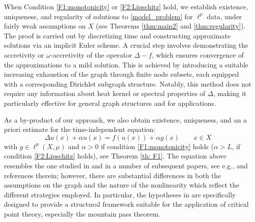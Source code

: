 \documentclass[journal]{article}
\theoremstyle{nonitalic}
\theoremstyle{nonitalic}
\theoremstyle{plain} %
\numberwithin{equation}{section}
\begin{document}
When Condition \ref{F1:monotonicity} or \ref{F2:Lipschitz} hold, we establish existence, uniqueness, and regularity of solutions to \ref{model_problem} for $\ell^p$ data, under fairly weak assumptions on $X$ (see Theorems \ref{thm:main2} and \ref{thm:regularity}). The proof is carried out by discretizing time and constructing approximate solutions via an implicit Euler scheme. A crucial step involves demonstrating the accretivity or $\omega$-accretivity of the operator $\Delta-f$, which ensures convergence of the approximations to a mild solution. This is achieved by introducing a suitable increasing exhaustion of the graph through finite node subsets, each equipped with a corresponding Dirichlet subgraph structure. Notably, this method does not require any information about heat kernel or spectral properties of $\Delta$, making it particularly effective for general graph structures and for applications. 

As a by-product of our approach, we also obtain existence, uniqueness, and an a priori estimate for the time-independent equation:
\begin{equation*}
  \Delta u (x)+ \alpha u(x)=f(u(x))+ \alpha g(x)\quad  \quad x \in X
\end{equation*}
with $g \in \ell^p(X,\mu)$ and $\alpha>0$ if condition \textnormal{\ref{F1:monotonicity}} holds ($\alpha>L$, if condition \textnormal{\ref{F2:Lipschitz}} holds), see Theorem \ref{th: F1}. 
The equation above resembles  the one studied in \cite{grigor2017existence} and in a number of subsequent papers, see e.g., \cite{yang2023existence} and references therein; however, there are substantial differences in both the assumptions on the graph and the nature of the nonlinearity which reflect the different strategies employed. In particular, the hypotheses in \cite{grigor2017existence} are specifically designed to provide a structural framework suitable for the application of critical point theory, especially the mountain pass theorem. 
\end{document}
